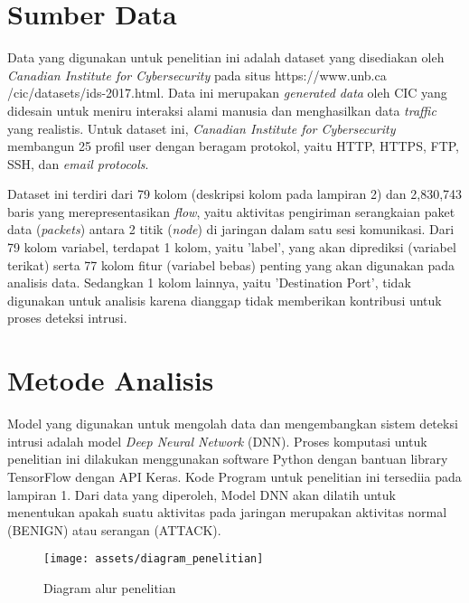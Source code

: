 \documentclass[a4paper,12pt]{report}
\begin{document}
\section{Sumber Data}
Data yang digunakan untuk penelitian ini adalah dataset yang disediakan oleh \textit{Canadian Institute for Cybersecurity} pada situs https://www.unb.ca \\
/cic/datasets/ids-2017.html. Data ini merupakan \textit{generated data} oleh CIC yang didesain untuk meniru interaksi alami manusia dan menghasilkan data \textit{traffic} yang realistis. Untuk dataset ini, \textit{Canadian Institute for Cybersecurity} membangun 25 profil user dengan beragam protokol, yaitu HTTP, HTTPS, FTP, SSH, dan \textit{email protocols}. 

Dataset ini terdiri dari 79 kolom (deskripsi kolom pada lampiran 2) dan 2,830,743 baris yang merepresentasikan \textit{flow}, yaitu aktivitas pengiriman serangkaian paket data (\textit{packets}) antara 2 titik (\textit{node}) di jaringan dalam satu sesi komunikasi. Dari 79 kolom variabel, terdapat 1 kolom, yaitu 'label', yang akan diprediksi (variabel terikat) serta 77 kolom fitur (variabel bebas) penting yang akan digunakan pada analisis data. Sedangkan 1 kolom lainnya, yaitu 'Destination Port', tidak digunakan untuk analisis karena dianggap tidak memberikan kontribusi untuk proses deteksi intrusi.

\section{Metode Analisis}
Model yang digunakan untuk mengolah data dan mengembangkan sistem deteksi intrusi adalah model \textit{Deep Neural Network} (DNN). Proses komputasi untuk penelitian ini dilakukan menggunakan software Python dengan bantuan library TensorFlow dengan API Keras. Kode Program untuk penelitian ini tersediia pada lampiran 1. Dari data yang diperoleh, Model DNN akan dilatih untuk menentukan apakah suatu aktivitas pada jaringan merupakan aktivitas normal (BENIGN) atau serangan (ATTACK). 

\begin{figure}[H]
	\center \texttt{[image: assets/diagram\_penelitian]}
	\caption{Diagram alur penelitian} 
	\label{diagram_penelitian}
\end{figure}
\end{document}
